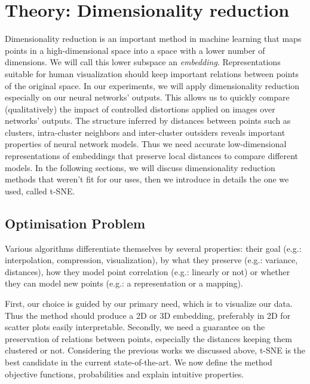 \documentclass[a4paper,12pt]{report}
\newcommand{\eg}{e.g.}
\begin{document}
\chapter{Theory: Dimensionality reduction}
Dimensionality reduction is an important method in machine learning that maps points in a high-dimensional space into a space with a lower number of dimensions.
We will call this lower subspace an {\em embedding}.
Representations suitable for human visualization should keep important relations between points of the original space.
In our experiments, we will apply dimensionality reduction especially on our neural networks' outputs.
This allows us to quickly compare (qualitatively) the impact of controlled distortions applied on images over networks' outputs.
The structure inferred by distances between points such as clusters, intra-cluster neighbors and inter-cluster outsiders reveals important properties of neural network models.
Thus we need accurate low-dimensional representations of embeddings that preserve local distances to compare different models.
In the following sections, we will discuss dimensionality reduction methods that weren't fit for our uses, then we introduce in details the one we used, called t-SNE.

\section{Optimisation Problem}
Various algorithms differentiate themselves by several properties: their goal (\eg: interpolation, compression, visualization), by what they preserve (\eg: variance, distances), how they model point correlation (\eg: linearly or not) or whether they can model new points (\eg: a representation or a mapping).

First, our choice is guided by our primary need, which is to visualize our data.
Thus the method should produce a 2D or 3D embedding, preferably in 2D for scatter plots easily interpretable.
Secondly, we need a guarantee on the preservation of relations between points, especially the distances keeping them clustered or not.
Considering the previous works we discussed above, t-SNE is the best candidate in the current state-of-the-art.
We now define the method objective functions, probabilities and explain intuitive properties.
\end{document}
